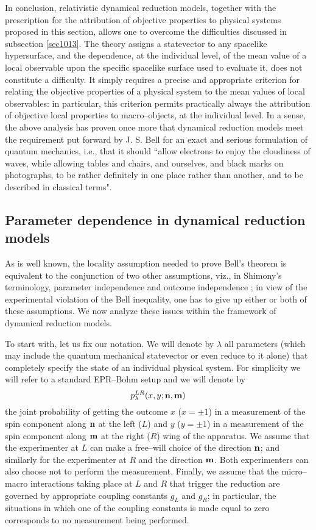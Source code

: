 \documentclass[12pt]{article}
\begin{document}
In conclusion, relativistic dynamical reduction models, together
with the prescription for the attribution of objective properties
to physical systems proposed in this section, allows one to
overcome the difficulties discussed in subsection \ref{sec1013}.
The theory assigns a statevector to any spacelike hypersurface,
and the dependence, at the individual level, of the mean value of
a local observable upon the specific spacelike surface used to
evaluate it, does not constitute a difficulty. It simply requires
a precise and appropriate criterion for relating the objective
properties of a physical system to the mean values of local
observables: in particular, this criterion permits practically
always the attribution of objective local properties to
macro--objects, at the individual level. In a sense, the above
analysis has proven once more that dynamical reduction models meet
the requirement put forward by J. S. Bell \cite{bellns} for an
exact and serious formulation of quantum mechanics, i.e., that it
should ``allow electrons to enjoy the cloudiness of waves, while
allowing tables and chairs, and ourselves, and black marks on
photographs, to be rather definitely in one place rather than
another, and to be described in classical terms".

\subsection{Parameter dependence in dynamical reduction models}
\label{sec011}

As is well known, the locality assumption needed to prove Bell's
theorem \cite{bell71} is equivalent to the conjunction of two
other assumptions, viz., in Shimony's terminology, parameter
independence and outcome independence \cite{sz,vf82,ja84,shi1}; in
view of the experimental violation of the Bell inequality, one has
to give up either or both of these assumptions. We now analyze
these issues within the framework of dynamical reduction models.

To start with, let us fix our notation. We will denote by
$\lambda$ all parameters (which may include the quantum mechanical
statevector or even reduce to it alone) that completely specify
the state of an individual physical system. For simplicity we will
refer to a standard EPR--Bohm setup and we will denote by
\begin{equation}
p^{LR}_{\lambda}(x,y;{\bf n}, {\bf m})
\end{equation}
the joint probability of getting the outcome $x$ ($x = \pm 1$) in
a measurement of the spin component along ${\bf n}$ at the left
($L$) and $y$ ($y = \pm 1$) in a measurement of the spin component
along ${\bf m}$ at the right ($R$) wing of the apparatus. We
assume that the experimenter at $L$ can make a free--will choice
of the direction ${\bf n}$; and similarly for the experimenter at
$R$ and the direction ${\bf m}$. Both experimenters can also
choose not to perform the measurement. Finally, we assume that the
micro--macro interactions taking place at $L$ and $R$ that trigger
the reduction are governed by appropriate coupling constants
$g_{L}$ and $g_{R}$; in particular, the situations in which one of
the coupling constants is made equal to zero corresponds to no
measurement being performed.
\end{document}
